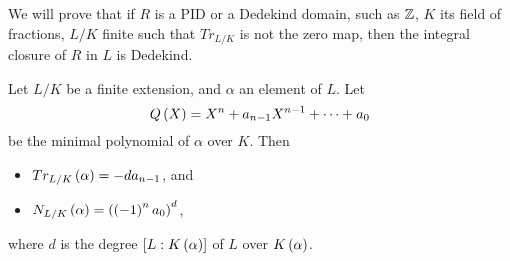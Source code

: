 We will prove that if $ R $ is a PID or a Dedekind domain, such as $ \mathbb{Z} $, $ K $ its field of fractions, $ L / K $ finite such that $ Tr_{L / K} $ is not the zero map, then the integral closure of $ R $ in $ L $ is Dedekind.


\begin{proposition}
\label{prop:12.2.2}
Let $ L / K $ be a finite extension, and $ \alpha $ an element of $ L $. Let
$$ Q\left( X \right) = X^n + a_{n - 1}X^{n - 1} + \dots + a_0 $$
be the minimal polynomial of $ \alpha $ over $ K $. Then
\begin{itemize}
\item $ Tr_{L / K}\left( \alpha \right) = -da_{n - 1} $, and
\item $ N_{L / K}\left( \alpha \right) = \left( \left( -1 \right)^na_0 \right)^d $,
\end{itemize}
where $ d $ is the degree $ \left[ L : K\left( \alpha \right) \right] $ of $ L $ over $ K\left( \alpha \right) $.
\end{proposition}

